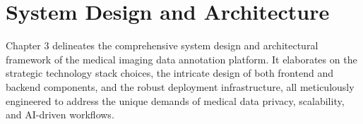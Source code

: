 \chapter{System Design and Architecture}
\label{sec:System Design and Architecture}
\begin{ChapAbstract}
Chapter 3 delineates the comprehensive system design and architectural framework of the medical imaging data annotation platform. It elaborates on the strategic technology stack choices, the intricate design of both frontend and backend components, and the robust deployment infrastructure, all meticulously engineered to address the unique demands of medical data privacy, scalability, and AI-driven workflows.
\end{ChapAbstract}





% 
% 